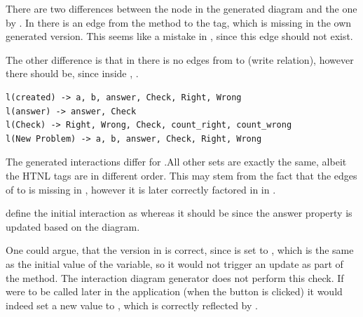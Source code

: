 There are two differences between the  node in the generated diagram and the one by \parencite{zhang2019scenario}.
In \textcite{zhang2019scenario} there is an edge from
the  method to the  tag, which is missing in the own generated version. This seems like a mistake in \parencite{zhang2019scenario}, since this edge should not exist.

The other difference is that in \parencite{zhang2019scenario} there is no edges from  to  (write relation), however there should be, since
inside , .

\begin{lstlisting}[language=JavaScriptPlain, caption={Interactions of the Math for Kids application}, captionpos=b]
l(created) -> a, b, answer, Check, Right, Wrong
l(answer) -> answer, Check
l(Check) -> Right, Wrong, Check, count_right, count_wrong
l(New Problem) -> a, b, answer, Check, Right, Wrong
\end{lstlisting}

The generated interactions differ for .All other sets are exactly the same, albeit the HTNL tags are in different order. This may stem from the fact that the edges of  to  is missing in \parencite{zhang2019scenario}, however it is later correctly factored in in .

\textcite{zhang2019scenario} define the initial interaction as  
whereas it should be 
 since the answer property is updated based on the diagram. 

One could argue, that the version in \parencite{zhang2019scenario} is correct, since  is set to , which is the same as the initial value of the variable, so it would not trigger an update as part of the  method. The interaction diagram generator does not perform this check. If  were to be called later in the application (when the  button is clicked) it would indeed set a new value to , which is correctly reflected by \textcite{zhang2019scenario}.


